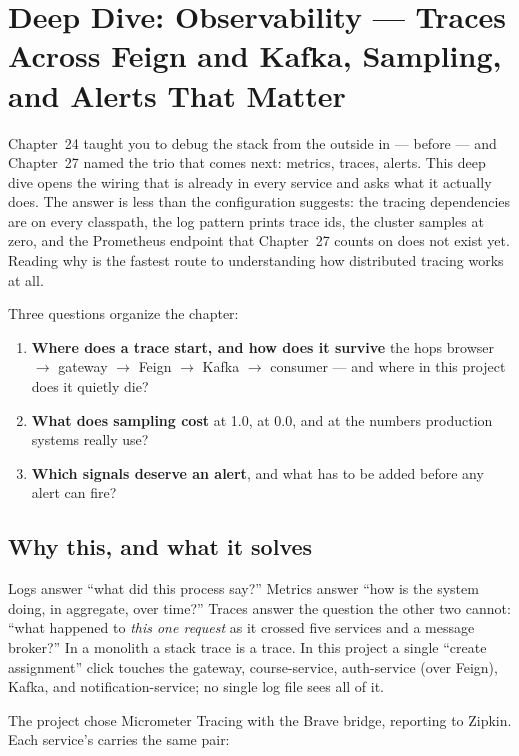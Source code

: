\chapter{Deep Dive: Observability --- Traces Across Feign and Kafka, Sampling, and Alerts That Matter}
\label{ch:dd-observability}

Chapter~24 taught you to debug the stack from the outside in ---
 before  --- and Chapter~27 named the trio
that comes next: metrics, traces, alerts. This deep dive opens the
wiring that is already in every service and asks what it actually does.
The answer is less than the configuration suggests: the tracing
dependencies are on every classpath, the log pattern prints trace ids,
the cluster samples at zero, and the Prometheus endpoint that Chapter~27
counts on does not exist yet. Reading why is the fastest route to
understanding how distributed tracing works at all.

Three questions organize the chapter:

\begin{enumerate}
  \item \textbf{Where does a trace start, and how does it survive} the
  hops browser $\rightarrow$ gateway $\rightarrow$ Feign $\rightarrow$
  Kafka $\rightarrow$ consumer --- and where in this project does it
  quietly die?
  \item \textbf{What does sampling cost} at 1.0, at 0.0, and at the
  numbers production systems really use?
  \item \textbf{Which signals deserve an alert}, and what has to be
  added before any alert can fire?
\end{enumerate}

\section{Why this, and what it solves}

Logs answer ``what did this process say?'' Metrics answer ``how is the
system doing, in aggregate, over time?'' Traces answer the question the
other two cannot: ``what happened to \emph{this one request} as it
crossed five services and a message broker?'' In a monolith a stack
trace is a trace. In this project a single ``create assignment'' click
touches the gateway, course-service, auth-service (over Feign),
Kafka, and notification-service; no single log file sees all of it.

The project chose Micrometer Tracing with the Brave bridge, reporting to
Zipkin. Each service's  carries the same pair:

